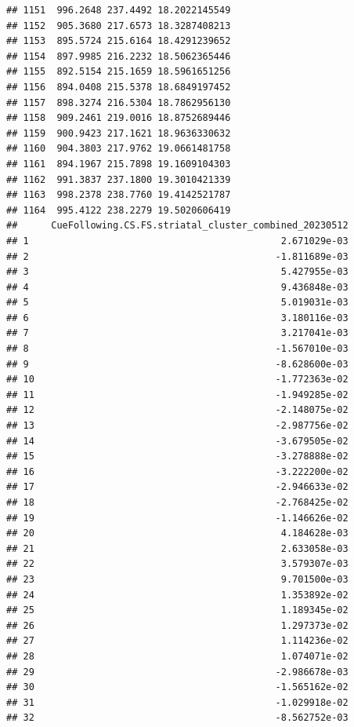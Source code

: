 \documentclass[
]{article}
\begin{document}
\begin{verbatim}
## 1151  996.2648 237.4492 18.2022145549
## 1152  905.3680 217.6573 18.3287408213
## 1153  895.5724 215.6164 18.4291239652
## 1154  897.9985 216.2232 18.5062365446
## 1155  892.5154 215.1659 18.5961651256
## 1156  894.0408 215.5378 18.6849197452
## 1157  898.3274 216.5304 18.7862956130
## 1158  909.2461 219.0016 18.8752689446
## 1159  900.9423 217.1621 18.9636330632
## 1160  904.3803 217.9762 19.0661481758
## 1161  894.1967 215.7898 19.1609104303
## 1162  991.3837 237.1800 19.3010421339
## 1163  998.2378 238.7760 19.4142521787
## 1164  995.4122 238.2279 19.5020606419
##      CueFollowing.CS.FS.striatal_cluster_combined_20230512
## 1                                             2.671029e-03
## 2                                            -1.811689e-03
## 3                                             5.427955e-03
## 4                                             9.436848e-03
## 5                                             5.019031e-03
## 6                                             3.180116e-03
## 7                                             3.217041e-03
## 8                                            -1.567010e-03
## 9                                            -8.628600e-03
## 10                                           -1.772363e-02
## 11                                           -1.949285e-02
## 12                                           -2.148075e-02
## 13                                           -2.987756e-02
## 14                                           -3.679505e-02
## 15                                           -3.278888e-02
## 16                                           -3.222200e-02
## 17                                           -2.946633e-02
## 18                                           -2.768425e-02
## 19                                           -1.146626e-02
## 20                                            4.184628e-03
## 21                                            2.633058e-03
## 22                                            3.579307e-03
## 23                                            9.701500e-03
## 24                                            1.353892e-02
## 25                                            1.189345e-02
## 26                                            1.297373e-02
## 27                                            1.114236e-02
## 28                                            1.074071e-02
## 29                                           -2.986678e-03
## 30                                           -1.565162e-02
## 31                                           -1.029918e-02
## 32                                           -8.562752e-03

\end{verbatim}
\end{document}
